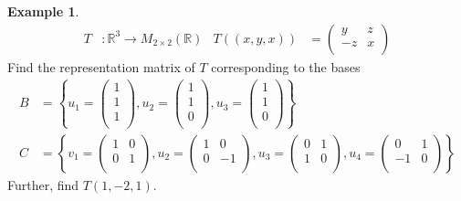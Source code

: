 \documentclass[fleqn, a4paper, 12pt]{article}
\theoremstyle{definition}
\newtheorem{example}{Example}
\theoremstyle{theorem}
\begin{document}
\begin{example}
	\begin{align*}
		T &: \mathbb{R}^3 \to M_{2 \times 2} (\mathbb{R}) & T((x,y,x)) &= 
		\begin{pmatrix}
			y & z\\
			-z & x\\
		\end{pmatrix}
	\end{align*}
	Find the representation matrix of $T$ corresponding to the bases
	\begin{align*}
		B &= 
			\left\lbrace
				u_1 = 
					\begin{pmatrix}
						1\\
						1\\
						1\\
					\end{pmatrix}
				,
				u_2 = 
					\begin{pmatrix}
						1\\
						1\\
						0\\
					\end{pmatrix}
				,
				u_3 = 
					\begin{pmatrix}
						1\\
						1\\
						0\\
					\end{pmatrix}
			\right\rbrace\\
		C &= 
			\left\lbrace
				v_1 = 
					\begin{pmatrix}
						1 & 0\\
						0 & 1\\
					\end{pmatrix}
				,
				u_2 = 
					\begin{pmatrix}
						1 & 0\\
						0 & -1\\
					\end{pmatrix}
				,
				u_3 = 
					\begin{pmatrix}
						0 & 1\\
						1 & 0\\
					\end{pmatrix}
				,
				u_4 = 
					\begin{pmatrix}
						0 & 1\\
						-1 & 0\\
					\end{pmatrix}
			\right\rbrace
	\end{align*}
	Further, find $T(1, -2, 1)$.
\end{example}
\end{document}
